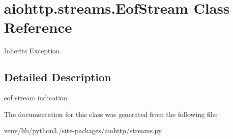 \hypertarget{classaiohttp_1_1streams_1_1_eof_stream}{}\section{aiohttp.\+streams.\+Eof\+Stream Class Reference}
\label{classaiohttp_1_1streams_1_1_eof_stream}


Inherits Exception.



\subsection{Detailed Description}
\begin{DoxyVerb}eof stream indication.\end{DoxyVerb}
 

The documentation for this class was generated from the following file\+:\begin{DoxyCompactItemize}
\item 
venv/lib/python3./site-\/packages/aiohttp/streams.\+py\end{DoxyCompactItemize}
